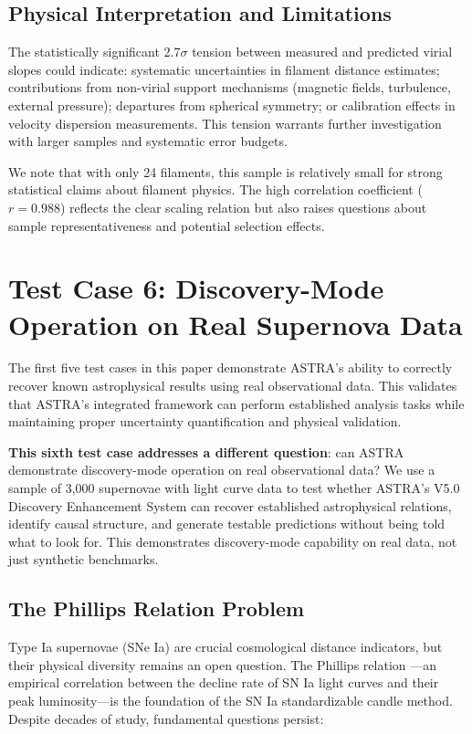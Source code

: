 \documentclass[usenatbib]{rasti}
\begin{document}
\subsection{Physical Interpretation and Limitations}

The statistically significant 2.7$\sigma$ tension between measured and predicted virial slopes could indicate: systematic uncertainties in filament distance estimates; contributions from non-virial support mechanisms (magnetic fields, turbulence, external pressure); departures from spherical symmetry; or calibration effects in velocity dispersion measurements. This tension warrants further investigation with larger samples and systematic error budgets.

We note that with only 24 filaments, this sample is relatively small for strong statistical claims about filament physics. The high correlation coefficient ($r = 0.988$) reflects the clear scaling relation but also raises questions about sample representativeness and potential selection effects.

\section{Test Case 6: Discovery-Mode Operation on Real Supernova Data}

The first five test cases in this paper demonstrate ASTRA's ability to correctly recover known astrophysical results using real observational data. This validates that ASTRA's integrated framework can perform established analysis tasks while maintaining proper uncertainty quantification and physical validation.

\textbf{This sixth test case addresses a different question}: can ASTRA demonstrate discovery-mode operation on real observational data? We use a sample of 3,000 supernovae with light curve data to test whether ASTRA's V5.0 Discovery Enhancement System can recover established astrophysical relations, identify causal structure, and generate testable predictions without being told what to look for. This demonstrates discovery-mode capability on real data, not just synthetic benchmarks.

\subsection{The Phillips Relation Problem}

Type Ia supernovae (SNe Ia) are crucial cosmological distance indicators, but their physical diversity remains an open question. The Phillips relation \cite{phillips1993}---an empirical correlation between the decline rate of SN Ia light curves and their peak luminosity---is the foundation of the SN Ia standardizable candle method. Despite decades of study, fundamental questions persist:
\end{document}
